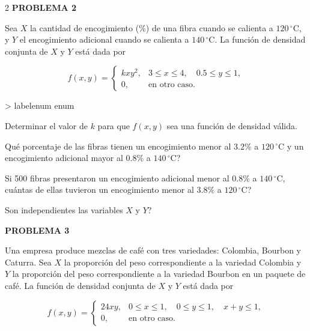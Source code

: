 \documentclass[11pt,letterpaper]{article}
\makeatletter
\renewenvironment{enumerate}
  {\ifnum \@enumdepth >\thr@@\@toodeep\else
   \advance\@enumdepth\@ne
   \edef\@enumctr{enum\romannumeral\the\@enumdepth}%
   \expandafter\list\csname label\@enumctr\endcsname
     {\usecounter\@enumctr
      \setlength{\topsep}{3pt}%
      \setlength{\itemsep}{2pt}%
      \setlength{\parsep}{0pt}%
      \setlength{\partopsep}{0pt}%
      \setlength{\leftmargin}{1.6em}%
      \setlength{\labelsep}{0.4em}}%
   \fi}
  {\endlist}
\newcommand{\problema}[1]{%
  \vspace{2pt}
  \noindent\textbf{\large PROBLEMA #1}\par
  \vspace{2pt}
}
\makeatother
\begin{document}
\begin{multicols}{2}
\problema{2}

Sea \(X\) la cantidad de encogimiento (\%) de una fibra cuando se calienta a
\(120\,^{\circ}\mathrm{C}\), y \(Y\) el encogimiento adicional cuando se
calienta a \(140\,^{\circ}\mathrm{C}\). La función de densidad conjunta de
\(X\) y \(Y\) está dada por

\[
f(x,y)=
\begin{cases}
kxy^2, & 3\leq x\leq4,\quad 0.5\leq y\leq1,\\
0, & \text{en otro caso}.
\end{cases}
\]

\begin{enumerate}
\item Determinar el valor de \(k\) para que \(f(x,y)\) sea una función de densidad válida.
\item Qué porcentaje de las fibras tienen un encogimiento menor al \(3.2\%\) a \(120\,^{\circ}\mathrm{C}\) y un encogimiento adicional mayor al \(0.8\%\) a \(140\,^{\circ}\mathrm{C}\)?
\item Si 500 fibras presentaron un encogimiento adicional menor al \(0.8\%\) a \(140\,^{\circ}\mathrm{C}\), cuántas de ellas tuvieron un encogimiento menor al \(3.8\%\) a \(120\,^{\circ}\mathrm{C}\)?
\item Son independientes las variables \(X\) y \(Y\)?
\end{enumerate}

\problema{3}

Una empresa produce mezclas de café con tres variedades: Colombia, Bourbon y
Caturra. Sea \(X\) la proporción del peso correspondiente a la variedad
Colombia y \(Y\) la proporción del peso correspondiente a la variedad Bourbon
en un paquete de café. La función de densidad conjunta de \(X\) y \(Y\) está
dada por

\[
f(x,y)=
\begin{cases}
24xy, & 0\leq x\leq1,\quad 0\leq y\leq1,\quad x+y\leq1,\\
0, & \text{en otro caso}.
\end{cases}
\]


\end{multicols}
\end{document}

